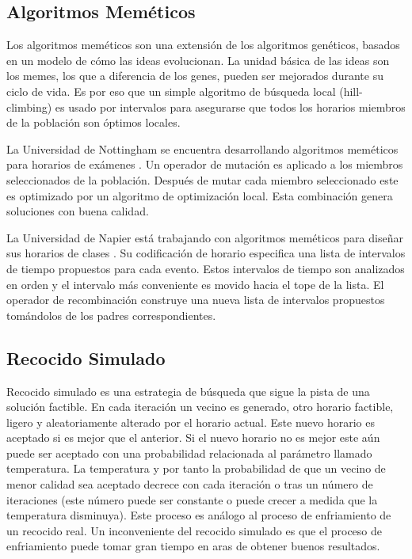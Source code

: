\subsection{Algoritmos Mem\'eticos}

Los algoritmos mem\'eticos son una extensión de los algoritmos gen\'eticos, basados en un modelo de cómo las ideas evolucionan. La unidad básica de las ideas son los memes, los que a diferencia de los genes, pueden ser mejorados durante su ciclo de vida. Es por eso que un simple algoritmo de búsqueda local (hill-climbing) es usado por intervalos
para asegurarse que todos los horarios miembros de la población son óptimos locales.

La Universidad de Nottingham se encuentra desarrollando algoritmos mem\'eticos para horarios de exámenes \cite{EK Burke and JP Newall and RF Weare}. Un operador de mutación es aplicado a los miembros seleccionados de la población. Despu\'es de mutar cada miembro seleccionado este es optimizado por un algoritmo de optimización local. Esta combinación genera soluciones con buena calidad.

La Universidad de Napier está trabajando con algoritmos mem\'eticos para diseñar sus horarios de clases \cite{B Paechter and A Cumming and MG Norman and H Luchian}. Su codificación de horario especifica una lista de intervalos de tiempo propuestos para cada evento. Estos intervalos de tiempo son analizados en orden y el intervalo más conveniente es movido hacia el tope de la lista. El operador de recombinación construye una nueva lista de intervalos propuestos tomándolos de los padres correspondientes.

\subsection{Recocido Simulado}

Recocido simulado es una estrategia de búsqueda que sigue la pista de una solución factible. En cada iteración un vecino es generado, otro horario factible, ligero y aleatoriamente alterado por el horario actual. Este nuevo horario es aceptado si es mejor que el anterior. Si el nuevo horario no es mejor este aún puede ser aceptado con una probabilidad relacionada al parámetro llamado temperatura. La temperatura y por tanto la probabilidad de que un vecino de menor calidad sea aceptado decrece con cada iteración o tras un número de iteraciones (este número puede ser constante o puede crecer a medida que la temperatura disminuya). Este proceso es análogo al proceso de enfriamiento de un recocido real. Un inconveniente del recocido simulado es que el proceso de enfriamiento puede tomar gran tiempo en aras de obtener buenos resultados.

